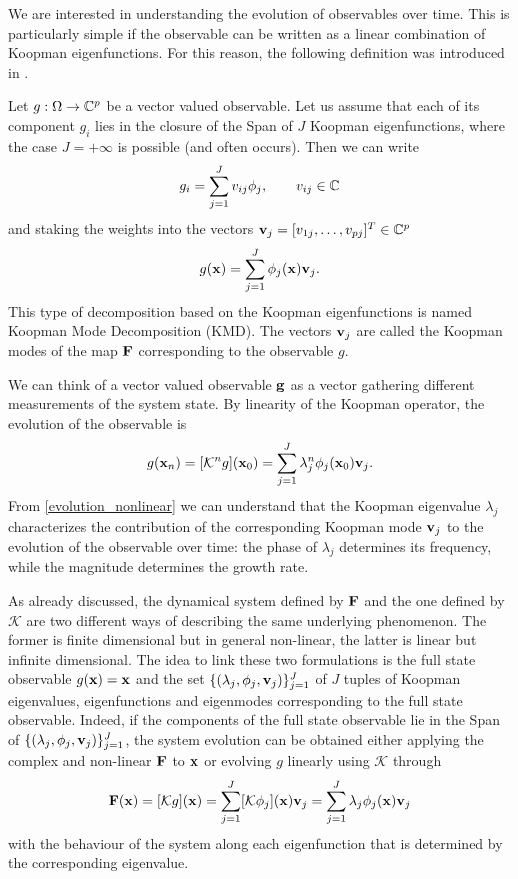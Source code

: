 We are interested in understanding the evolution of observables over time. This is particularly simple if the observable can be written as a linear combination of Koopman eigenfunctions. For this reason, the following definition was introduced in \cite{rowley_spectral_2009}.
\begin{definition}
Let $g:\Omega\to\mathbb{C}^p$ be a vector valued observable. Let us assume that each of its component $g_i$ lies in the closure of the Span of $J$ Koopman eigenfunctions, where the case $J=+\infty$ is possible (and often occurs). Then we can write 
\begin{equation*}
	g_i = \sum_{j = 1}^J v_{ij}\phi_j, \qquad v_{ij}\in\mathbb{C}
\end{equation*}
and staking the weights into the vectors $\vb{v}_j = [v_{1j},\dots,v_{pj}]^T\in\mathbb{C}^p$ 
\begin{equation}
    \label{koopman_modes}
	g(\vb{x}) = \sum_{j = 1}^J \phi_j(\vb{x})\vb{v}_{j}.
\end{equation}
This type of decomposition based on the Koopman eigenfunctions is named Koopman Mode Decomposition (KMD). The vectors $\vb{v}_j$ are called the Koopman modes of the map $\vb{F}$ corresponding to the observable $g$. 
\end{definition}

We can think of a vector valued observable $\vb{g}$ as a vector gathering different measurements of the system state. By linearity of the Koopman operator, the evolution of the observable is
\begin{equation}
	\label{evolution_nonlinear}
	g(\vb{x}_n) = [\mathcal{K}^ng](\vb{x}_0) = \sum_{j = 1}^J \lambda_j^n\phi_j(\vb{x}_0)\vb{v}_{j}.
\end{equation}
From \eqref{evolution_nonlinear} we can understand that the Koopman eigenvalue $\lambda_j$ characterizes the contribution of the corresponding Koopman mode $\vb{v}_j$ to the evolution of the observable over time: the phase of $\lambda_j$ determines its frequency, while the magnitude determines the growth rate.

As already discussed, the dynamical system defined by $\vb{F}$ and the one defined by $\mathcal{K}$ are two different ways of describing the same underlying phenomenon. The former is finite dimensional but in general non-linear, the latter is linear but infinite dimensional. The idea to link these two formulations is the full state observable $g(\vb{x}) = \vb{x}$ and the set $\{(\lambda_j, \phi_j, \vb{v}_j)\}_{j = 1}^J$ of $J$ tuples of Koopman eigenvalues, eigenfunctions and eigenmodes corresponding to the full state observable. Indeed, if the components of the full state observable lie in the Span of $\{(\lambda_j, \phi_j, \vb{v}_j)\}_{j = 1}^J$, the system evolution can be obtained either applying the complex and non-linear $\vb{F}$ to $\vb{x}$ or evolving $g$ linearly using $\mathcal{K}$ through
\begin{equation*}
	\vb{F}(\vb{x}) = [\mathcal{K}g](\vb{x}) = \sum_{j = 1}^J [\mathcal{K}\phi_j](\vb{x})\vb{v}_j = \sum_{j = 1}^J \lambda_j\phi_j(\vb{x})\vb{v}_j
\end{equation*}
with the behaviour of the system along each eigenfunction that is determined by the corresponding eigenvalue.
